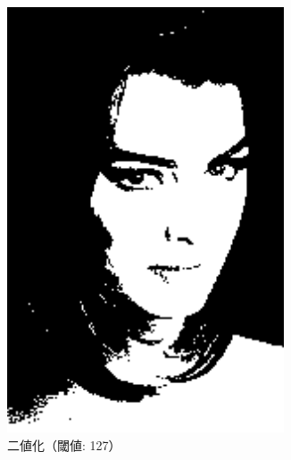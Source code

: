 \documentclass[a4paper,12pt]{jsarticle}
\begin{document}
\begin{figure}[!htbp]
\begin{subfigure}[b]{0.45\textwidth}
    \centering
    \includegraphics[width=0.9\textwidth]{./images/binarized_sample6_binary.png}
    \caption{二値化（閾値: 127）}
\end{subfigure}
\hfill
\begin{subfigure}[b]{0.45\textwidth}
    \centering

\end{subfigure}
\end{figure}
\end{document}

